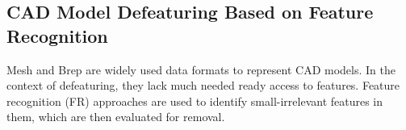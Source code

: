 
\subsection{CAD Model Defeaturing Based on Feature Recognition}

Mesh and Brep are widely used data formats to represent CAD models. In the context of defeaturing, they lack much needed ready access to features. Feature recognition (FR) approaches are used to identify small-irrelevant features in them, which are then evaluated for removal. 

